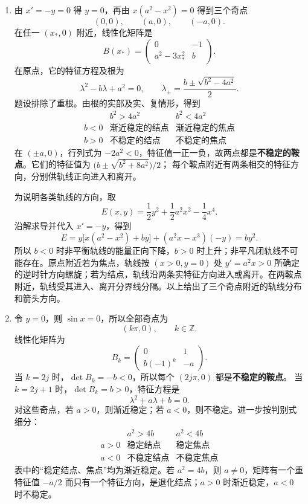 \documentclass[UTF8,a4paper,11pt]{ctexart}
\begin{document}
\begin{solution}
\begin{enumerate}[label=(\arabic*)]
\item 由 $x'=-y=0$ 得 $y=0$，再由 $x(a^2-x^2)=0$ 得到三个奇点
\[
(0,0),\qquad(a,0),\qquad(-a,0).
\]
在任一 $(x_*,0)$ 附近，线性化矩阵是
\[
B(x_*)=
\begin{pmatrix}0&-1\\ a^2-3x_*^2&b\end{pmatrix}.
\]
在原点，它的特征方程及根为
\[
\lambda^2-b\lambda+a^2=0,\qquad
\lambda_\pm=\frac{b\pm\sqrt{b^2-4a^2}}2.
\]
题设排除了重根。由根的实部及实、复情形，得到
\[
\begin{array}{c|c|c}
 &b^2>4a^2&b^2<4a^2\\ \hline
b<0&\text{渐近稳定的结点}&\text{渐近稳定的焦点}\\
b>0&\text{不稳定的结点}&\text{不稳定的焦点}
\end{array}
\]
在 $(\pm a,0)$，行列式为 $-2a^2<0$，特征值一正一负，故两点都是\textbf{不稳定的鞍点}。它们的特征值为
$\bigl(b\pm\sqrt{b^2+8a^2}\bigr)/2$；
每个鞍点附近有两条相交的特征方向，分别供轨线正向进入和离开。

为说明各类轨线的方向，取
\[
E(x,y)=\frac12y^2+\frac12a^2x^2-\frac14x^4.
\]
沿解求导并代入 $x'=-y$，得到
\[
\dot E
=y\bigl[x(a^2-x^2)+by\bigr]+(a^2x-x^3)(-y)
=by^2.
\]
所以 $b<0$ 时非平衡轨线的能量正向下降，$b>0$ 时上升；非平凡闭轨线不可能存在。原点附近若为焦点，轨线按 $(x>0,y=0)$ 处 $y'=a^2x>0$ 所确定的逆时针方向螺旋；若为结点，轨线沿两条实特征方向进入或离开。在两鞍点附近，轨线受其进入、离开分界线分隔。以上给出了三个奇点附近的轨线分布和箭头方向。

\item 令 $y=0$，则 $\sin x=0$，所以全部奇点为
\[
(k\pi,0),\qquad k\in\mathbb Z.
\]
线性化矩阵为
\[
B_k=\begin{pmatrix}0&1\\ b(-1)^k&-a\end{pmatrix}.
\]
当 $k=2j$ 时，$\det B_k=-b<0$，所以每个 $(2j\pi,0)$ 都是\textbf{不稳定的鞍点}。
当 $k=2j+1$ 时，$\det B_k=b>0$，特征方程是
\[
\lambda^2+a\lambda+b=0.
\]
对这些奇点，若 $a>0$，则渐近稳定；若 $a<0$，则不稳定。进一步按判别式细分：
\[
\begin{array}{c|c|c}
 &a^2>4b&a^2<4b\\ \hline
a>0&\text{稳定结点}&\text{稳定焦点}\\
a<0&\text{不稳定结点}&\text{不稳定焦点}
\end{array}
\]
表中的“稳定结点、焦点”均为渐近稳定。若 $a^2=4b$，则 $a\ne0$，矩阵有一个重特征值 $-a/2$ 而只有一个特征方向，是退化结点；$a>0$ 时渐近稳定，$a<0$ 时不稳定。


\end{enumerate}
\end{solution}
\end{document}
